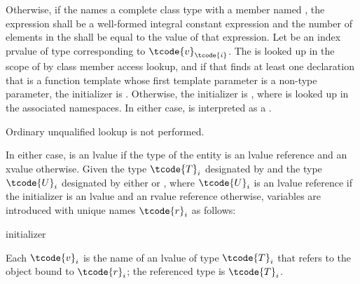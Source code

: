 \pnum
Otherwise, if
the  
names a complete class type with a member named ,
the expression 
shall be a well-formed integral constant expression
and
the number of elements in
the  shall be equal to the value of that
expression.
Let  be an index prvalue of type 
corresponding to $\tcode{v}_\tcode{i}$.
The   is looked up
in the scope of  by class member access lookup,
and if that finds at least one declaration
that is a function template whose first template parameter
is a non-type parameter,
the initializer is
. Otherwise, the initializer is ,
where  is looked up in the associated namespaces.
In either case,  is interpreted as a .
\begin{note}
Ordinary unqualified lookup is not performed.
\end{note}
In either case,  is an lvalue if the type of the entity 
is an lvalue reference and an xvalue otherwise.
Given the type $\tcode{T}_i$ designated by
 and
the type $\tcode{U}_i$ designated by
either  or ,
where $\tcode{U}_i$ is an lvalue reference if
the initializer is an lvalue and an rvalue reference otherwise,
variables are introduced with unique names $\tcode{r}_i$ as follows:

\begin{ncbnf}
  initializer \terminal{;}
\end{ncbnf}

Each $\tcode{v}_i$ is the name of an lvalue of type $\tcode{T}_i$
that refers to the object bound to $\tcode{r}_i$;
the referenced type is $\tcode{T}_i$.

